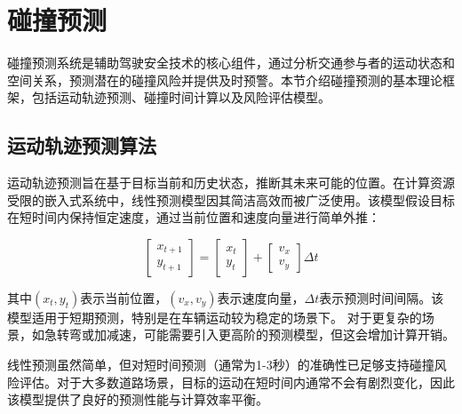 \documentclass[a4paper, UTF8, fontsize=12pt]{ctexart} %
\numberwithin{equation}{section} %
\begin{document}
\newpage
\renewcommand{\thefigure}{\thesection-\arabic{figure}}
\renewcommand{\thetable}{\thesection-\arabic{table}}
\renewcommand{\figurename}{图}
\setcounter{figure}{0} %
\setcounter{equation}{0} %
\section{碰撞预测}

碰撞预测系统是辅助驾驶安全技术的核心组件，通过分析交通参与者的运动状态和空间关系，预测潜在的碰撞风险并提供及时预警。本节介绍碰撞预测的基本理论框架，包括运动轨迹预测、碰撞时间计算以及风险评估模型。

\subsection{运动轨迹预测算法}

运动轨迹预测旨在基于目标当前和历史状态，推断其未来可能的位置。在计算资源受限的嵌入式系统中，线性预测模型因其简洁高效而被广泛使用。该模型假设目标在短时间内保持恒定速度，通过当前位置和速度向量进行简单外推：

\begin{equation}
\begin{bmatrix} x_{t+1} \\ y_{t+1} \end{bmatrix} = \begin{bmatrix} x_t \\ y_t \end{bmatrix} + \begin{bmatrix} v_x \\ v_y \end{bmatrix} \Delta t
\end{equation}

其中$(x_t, y_t)$表示当前位置，$(v_x, v_y)$表示速度向量，$\Delta t$表示预测时间间隔。该模型适用于短期预测，特别是在车辆运动较为稳定的场景下。
对于更复杂的场景，如急转弯或加减速，可能需要引入更高阶的预测模型，但这会增加计算开销。

线性预测虽然简单，但对短时间预测（通常为1-3秒）的准确性已足够支持碰撞风险评估。对于大多数道路场景，目标的运动在短时间内通常不会有剧烈变化，因此该模型提供了良好的预测性能与计算效率平衡。
\end{document}
